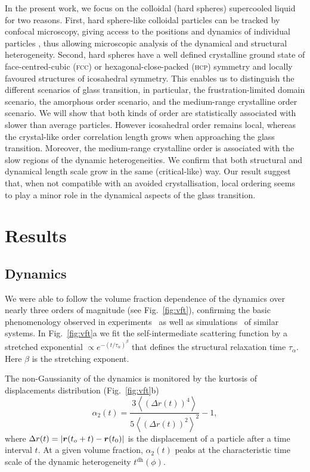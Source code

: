 In the present work, we focus on the colloidal (hard spheres) supercooled liquid \cite{pusey1987ogt} for two reasons. First, hard sphere-like colloidal particles can be tracked by confocal microscopy, giving access to the positions and dynamics of individual particles \cite{kegel2000swe, weeks2000}, thus allowing microscopic analysis of the dynamical and structural heterogeneity. Second, hard spheres have a well defined crystalline ground state of face-centred-cubic (\textsc{fcc}) or hexagonal-close-packed (\textsc{hcp}) symmetry and locally favoured structures of icosahedral symmetry. This enables us to distinguish the different scenarios of glass transition, in particular, the frustration-limited domain scenario, the amorphous order scenario, and the medium-range crystalline order scenario. We will show that both kinds of order are statistically associated with slower than average particles. However icosahedral order remains local, whereas the crystal-like order correlation length grows when approaching the glass transition. Moreover, the medium-range crystalline order is associated with the slow regions of the dynamic heterogeneities. We confirm that both structural and dynamical length scale grow in the same (critical-like) way. Our result suggest that, when not compatible with an avoided crystallisation, local ordering seems to play a minor role in the dynamical aspects of the glass transition.


\section*{Results}

\subsection*{Dynamics}

We were able to follow the volume fraction dependence of the dynamics over nearly three orders of magnitude (see Fig.~\ref{fig:vft}), confirming the basic phenomenology observed in experiments~\citep{pusey1987ogt, kegel2000swe, weeks2000, BerthierR} as well as simulations~\citep{tanaka2010critical} of similar systems. In Fig.~\ref{fig:vft}a we fit the self-intermediate scattering function by a stretched exponential $\propto e^{-(t/\tau_\alpha)^\beta}$ that defines the structural relaxation time $\tau_\alpha$. 
Here $\beta$ is the stretching exponent. 

The non-Gaussianity of the dynamics is monitored by the kurtosis of displacements distribution (Fig.~\ref{fig:vft}b)
\begin{equation}
	\alpha_2(t) = \frac{3 \left\langle {(\Delta r(t))^4} \right\rangle}{5 {\left\langle {(\Delta r(t))^2} \right\rangle}^2}-1, 
	\label{eq:ng}
\end{equation}
where $\Delta r(t)= |\mbox{\boldmath$r$}(t_o+t)- \mbox{\boldmath$r$}(t_0)|$ is the displacement of a particle after a time interval $t$. At a given volume fraction, $\alpha_2(t)$ peaks at the characteristic time scale of the dynamic heterogeneity $t^\text{dh}(\phi)$.

